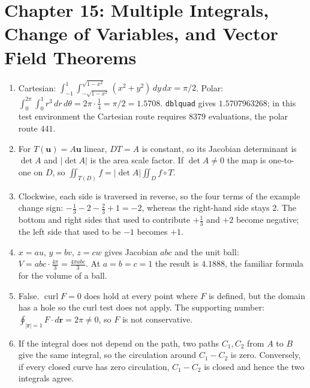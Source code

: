 \section*{Chapter 15: Multiple Integrals, Change of Variables, and Vector Field Theorems}
\begin{enumerate}[label=\textbf{15.\arabic*}]
  \item Cartesian: $\int_{-1}^{1}\int_{-\sqrt{1-x^{2}}}^{\sqrt{1-x^{2}}}
        (x^{2}+y^{2})\,dy\,dx=\pi/2$. Polar:
        $\int_{0}^{2\pi}\int_{0}^{1}r^{3}\,dr\,d\theta
        =2\pi\cdot\tfrac14=\pi/2=1.5708$. \texttt{dblquad} gives
        $1.5707963268$; in this test environment the Cartesian route requires $8379$
        evaluations, the polar route $441$.

  \item For $T(\mathbf{u})=A\mathbf{u}$ linear, $DT=A$ is constant, so
        its Jacobian determinant is $\det A$ and $\lvert\det A\rvert$ is the area
        scale factor. If $\det A\ne0$ the map is one-to-one on $D$, so
        $\iint_{T(D)}f=\lvert\det A\rvert\iint_{D}f\circ T$.

  \item Clockwise, each side is traversed in reverse, so the four terms of the example
        change sign: $-\tfrac13-2-\tfrac23+1=-2$, whereas the right-hand side stays
        $2$. The bottom and right sides that used to contribute $+\tfrac13$ and $+2$
        become negative; the left side that used to be $-1$ becomes $+1$.

  \item $x=au$, $y=bv$, $z=cw$ gives Jacobian $abc$ and the unit ball:
        $V=abc\cdot\frac{4\pi}{3}=\frac{4\pi abc}{3}$. At $a=b=c=1$
        the result is $4.1888$, the familiar formula for the volume of a ball.

  \item False. $\operatorname{curl}F=0$ does hold at every point where $F$
        is defined, but the domain has a hole so the curl test does not apply.
        The supporting number: $\oint_{\lvert\mathbf{r}\rvert=1}F\cdot d\mathbf{r}
        =2\pi\ne0$, so $F$ is not conservative.

  \item If the integral does not depend on the path, two paths $C_{1},C_{2}$ from
        $A$ to $B$ give the same integral, so the circulation around $C_{1}-C_{2}$ is zero.
        Conversely, if every closed curve has zero circulation, $C_{1}-C_{2}$ is
        closed and hence the two integrals agree.


\end{enumerate}
